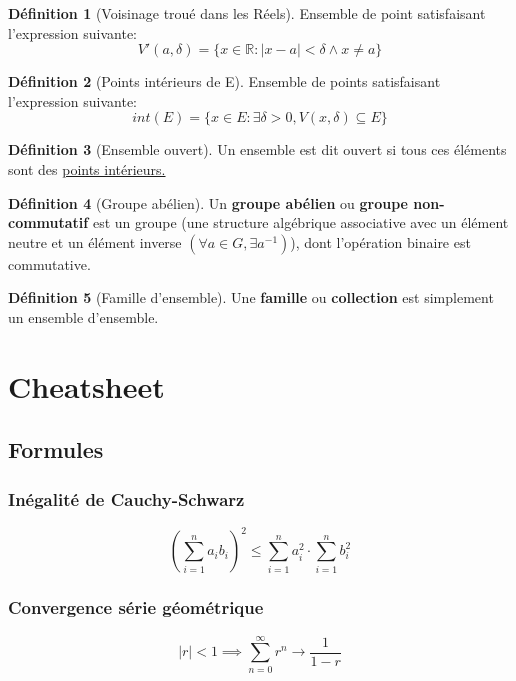 \documentclass[12pt]{book}
\let\Bbb\mathbb
\newcommand\todo[1]{\phantom{#1}}
\theoremstyle{definition}
\newtheorem{definition}{Définition}[section]
\begin{document}
\begin{definition}[Voisinage troué dans les Réels]
    \label{def:voisinage_troue_reels}
    Ensemble de point satisfaisant l'expression
    suivante: $$V'(a, \delta) = \{ x \in \Bbb R : |x - a| < \delta \land x \neq a \}$$
\end{definition}

\begin{definition}[Points intérieurs de E]
    \label{def:point_int}
    Ensemble de points satisfaisant l'expression
    suivante: $$int(E) = \{ x \in E : \exists \delta > 0, V(x, \delta) \subseteq E \} $$
\end{definition}

\begin{definition}[Ensemble ouvert]
    \label{def:ensemble_ouvert}
    Un ensemble est dit ouvert si tous ces éléments sont des \hyperref[def:point_int]{points intérieurs.}
\end{definition}

\begin{definition}[Groupe abélien]
    \label{def:groupe_abelien}
    Un \textbf{groupe abélien} ou \textbf{groupe non-commutatif} est un groupe
    (une structure algébrique associative avec un élément neutre et un élément inverse $(\forall a \in G, \exists a^{-1})$), 
    dont l'opération binaire est commutative.
\end{definition}

\begin{definition}[Famille d'ensemble]
    \label{def:famille}
    Une \textbf{famille} ou \textbf{collection} est simplement un ensemble d'ensemble.
\end{definition}
\todo{Add reference}

\chapter{Cheatsheet}
\section{Formules}
\subsection{Inégalité de Cauchy-Schwarz}
$$(\sum_{i=1}^{n} a_ib_i)^2 \leq \sum_{i=1}^{n} a_i^2 \cdot \sum_{i=1}^{n} b_i ^ 2$$ 
\subsection{Convergence série géométrique}
$$|r| < 1 \implies \sum_{n=0}^{\infty} r^n \to \frac{1}{1 - r} $$
\end{document}
